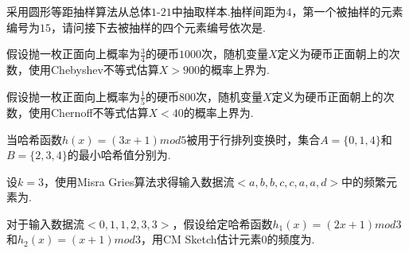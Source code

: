 \documentclass[list, windows]{BHCexam}
\begin{document}
\begin{groups}

\begin{questions}[p]
\begin{minipage}{\linewidth}
\question [4] 采用圆形等距抽样算法从总体$1$-$21$中抽取样本.抽样间距为$4$，第一个被抽样的元素编号为$15$，请问接下去被抽样的四个元素编号依次是.

\end{minipage}
\begin{solution}{4cm}

\end{solution}
\begin{minipage}{\linewidth}
\question [4] 假设抛一枚正面向上概率为$\frac{3}{4}$的硬币$1000$次，随机变量$X$定义为硬币正面朝上的次数，使用Chebyshev不等式估算$X>900$的概率上界为.

\end{minipage}
\begin{solution}{4cm}

\end{solution}
\begin{minipage}{\linewidth}
\question [4] 假设抛一枚正面向上概率为$\frac{1}{5}$的硬币$800$次，随机变量$X$定义为硬币正面朝上的次数，使用Chernoff不等式估算$X<40$的概率上界为.

\end{minipage}
\begin{solution}{4cm}

\end{solution}
\begin{minipage}{\linewidth}
\question [4] 当哈希函数$h(x)=(3x+1)mod 5$被用于行排列变换时，集合$A=\{0,1,4\}$和$B=\{2,3,4\}$的最小哈希值分别为.

\end{minipage}
\begin{solution}{4cm}

\end{solution}
\begin{minipage}{\linewidth}
\question [4] 设$k=3$，使用Misra Gries算法求得输入数据流$<a,b,b,c,c,a,a,d>$中的频繁元素为.

\end{minipage}
\begin{solution}{4cm}

\end{solution}
\begin{minipage}{\linewidth}
\question [4] 对于输入数据流$<0,1,1,2,3,3>$，假设给定哈希函数$h_{1}(x)=(2x+1) mod 3$和$h_{2}(x)=(x+1) mod 3$，用CM Sketch估计元素$0$的频度为.


\end{minipage}
\end{questions}
\end{groups}
\end{document}
